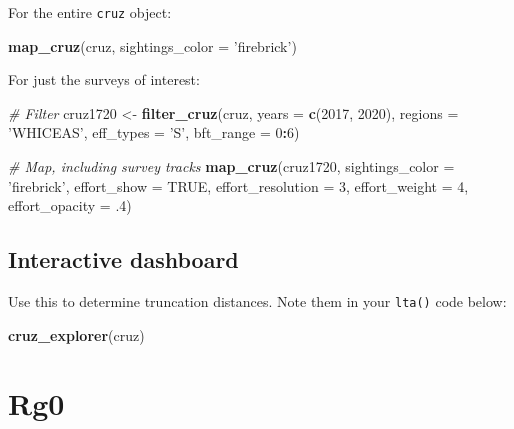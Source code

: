 \documentclass[
]{book}
\newenvironment{Shaded}{\begin{snugshade}}{\end{snugshade}}
\newcommand{\CommentTok}[1]{\textcolor[rgb]{0.56,0.35,0.01}{\textit{#1}}}
\newcommand{\DataTypeTok}[1]{\textcolor[rgb]{0.13,0.29,0.53}{#1}}
\newcommand{\DecValTok}[1]{\textcolor[rgb]{0.00,0.00,0.81}{#1}}
\newcommand{\FloatTok}[1]{\textcolor[rgb]{0.00,0.00,0.81}{#1}}
\newcommand{\KeywordTok}[1]{\textcolor[rgb]{0.13,0.29,0.53}{\textbf{#1}}}
\newcommand{\NormalTok}[1]{#1}
\newcommand{\OperatorTok}[1]{\textcolor[rgb]{0.81,0.36,0.00}{\textbf{#1}}}
\newcommand{\OtherTok}[1]{\textcolor[rgb]{0.56,0.35,0.01}{#1}}
\newcommand{\StringTok}[1]{\textcolor[rgb]{0.31,0.60,0.02}{#1}}
\begin{document}
For the entire \texttt{cruz} object:

\begin{Shaded}
\begin{Highlighting}[]
\KeywordTok{map_cruz}\NormalTok{(cruz, }\DataTypeTok{sightings_color =} \StringTok{'firebrick'}\NormalTok{)}
\end{Highlighting}
\end{Shaded}

For just the surveys of interest:

\begin{Shaded}
\begin{Highlighting}[]
\CommentTok{# Filter}
\NormalTok{cruz1720 <-}\StringTok{ }\KeywordTok{filter_cruz}\NormalTok{(cruz, }
                        \DataTypeTok{years =} \KeywordTok{c}\NormalTok{(}\DecValTok{2017}\NormalTok{, }\DecValTok{2020}\NormalTok{), }
                        \DataTypeTok{regions =} \StringTok{'WHICEAS'}\NormalTok{,}
                        \DataTypeTok{eff_types =} \StringTok{'S'}\NormalTok{,}
                        \DataTypeTok{bft_range =} \DecValTok{0}\OperatorTok{:}\DecValTok{6}\NormalTok{)}

\CommentTok{# Map, including survey tracks}
\KeywordTok{map_cruz}\NormalTok{(cruz1720,}
         \DataTypeTok{sightings_color =} \StringTok{'firebrick'}\NormalTok{, }
         \DataTypeTok{effort_show =} \OtherTok{TRUE}\NormalTok{, }
         \DataTypeTok{effort_resolution =} \DecValTok{3}\NormalTok{,}
         \DataTypeTok{effort_weight =} \DecValTok{4}\NormalTok{,}
         \DataTypeTok{effort_opacity =} \FloatTok{.4}\NormalTok{)}
\end{Highlighting}
\end{Shaded}

\hypertarget{interactive-dashboard-1}{%
\subsection*{Interactive dashboard}\label{interactive-dashboard-1}}

Use this to determine truncation distances. Note them in your \texttt{lta()} code below:

\begin{Shaded}
\begin{Highlighting}[]
\KeywordTok{cruz_explorer}\NormalTok{(cruz)}
\end{Highlighting}
\end{Shaded}

\hypertarget{rg0-1}{%
\section*{Rg0}\label{rg0-1}}
\end{document}
